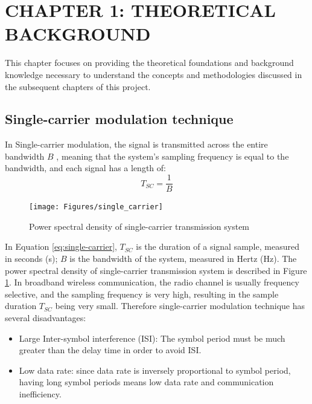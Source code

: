 \section*{CHAPTER 1: THEORETICAL BACKGROUND}
\setcounter{section}{1}
\setcounter{subsection}{0}
\setcounter{figure}{0}
\setcounter{table}{0}

This chapter focuses on providing the theoretical foundations and background knowledge necessary to understand the concepts and methodologies discussed in the subsequent chapters of this project.

\subsection{Single-carrier modulation technique}
In Single-carrier modulation, the signal is transmitted across the entire bandwidth $B$ \cite{OFDM2006}, meaning that the system's sampling frequency is equal to the bandwidth, and each signal has a length of:
\begin{equation}
    T_{SC} = \frac{1}{B}
    \label{eq:single-carrier}
\end{equation}

\begin{figure}[htbp]
    \centering
    \texttt{[image: Figures/single\_carrier]}
    \caption{Power spectral density of single-carrier transmission system}
    \label{fig:single-carrier}
\end{figure}

In Equation \ref{eq:single-carrier}, $T_{SC}$ is the duration of a signal sample, measured in seconds (s); $B$ is the bandwidth of the system, measured in Hertz (Hz). The power spectral density of single-carrier transmission system is described in Figure \ref{fig:single-carrier}. In broadband wireless communication, the radio channel is usually frequency selective, and the sampling frequency is very high, resulting in the sample duration $T_{SC}$ being very small. Therefore single-carrier modulation technique has several disadvantages:

\begin{itemize}
    \item Large Inter-symbol interference (ISI): The symbol period must be much greater than the delay time in order to avoid ISI.
    \item Low data rate: since data rate is inversely proportional to symbol period, having long symbol periods means low data rate and communication inefficiency.
\end{itemize}

